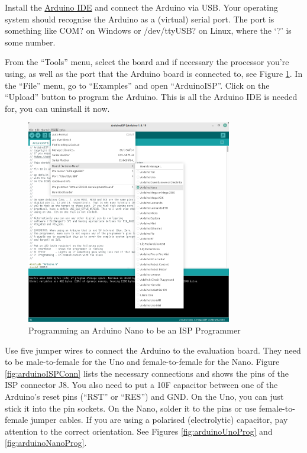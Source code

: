 \documentclass{article}
\begin{document}
Install the \href{https://www.arduino.cc/en/software}{Arduino IDE} and connect the Arduino via USB. Your operating system should recognise the Arduino as a (virtual) serial port. The port is something like COM? on Windows or /dev/ttyUSB? on Linux, where the `?' is some number. 

From the ``Tools'' menu, select the board and if necessary the processor you're using, as well as the port that the Arduino board is connected to, see Figure \ref{fig:arduinoIDE}. In the ``File'' menu, go to ``Examples'' and open ``ArduinoISP''. Click on the ``Upload'' button to program the Arduino. This is all the Arduino IDE is needed for, you can uninstall it now. 

\begin{figure}[htb]
\centering
\includegraphics[width=0.8\textwidth]{Pictures/ArduinoIDE.png}
\caption{Programming an Arduino Nano to be an ISP Programmer}
\label{fig:arduinoIDE}
\end{figure}

Use five jumper wires to connect the Arduino to the evaluation board. They need to be male-to-female for the Uno and female-to-female for the Nano. Figure \ref{fig:arduinoISPConn} lists the necessary connections and shows the pins of the ISP connector J8. You also need to put a 10\textmu F capacitor between one of the Arduino's reset pins (``RST'' or ``RES'') and GND. On the Uno, you can just stick it into the pin sockets. On the Nano, solder it to the pins or use female-to-female jumper cables. If you are using a polarised (electrolytic) capacitor, pay attention to the correct orientation. See Figures \ref{fig:arduinoUnoProg} and \ref{fig:arduinoNanoProg}. 
\end{document}
